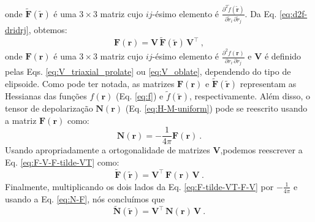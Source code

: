 onde $\tilde{\mathbf{F}}(\tilde{\mathbf{r}})$ é uma $3 \times 3$
matriz cujo $ij$-ésimo elemento é 
$\frac{\partial^{2} \tilde{f}(\tilde{\mathbf{r}})}
{\partial \tilde{r}_{i} \, \partial \tilde{r}_{j}}$.
Da Eq. \ref{eq:d2f-dridrj}, obtemos:
\begin{equation}
\mathbf{F}(\mathbf{r}) = \mathbf{V} \, 
\tilde{\mathbf{F}}(\tilde{\mathbf{r}}) \, \mathbf{V}^{\top} \: ,
\label{eq:F-V-F-tilde-VT}
\end{equation}
onde $\mathbf{F}(\mathbf{r})$ é uma $3 \times 3$
matriz cujo $ij$-ésimo elemento é 
$\frac{\partial^{2} f(\mathbf{r})}
{\partial r_{i} \, \partial r_{j}}$ e
$\mathbf{V}$ é definido pelas Eqs. 
\ref{eq:V_triaxial_prolate} ou
\ref{eq:V_oblate}, dependendo do tipo de
elipsoide. Como pode ter notada, as matrizes $\mathbf{F}(\mathbf{r})$ e
$\tilde{\mathbf{F}}(\tilde{\mathbf{r}})$ representam as Hessianas
das funções $f(\mathbf{r})$ (Eq. \ref{eq:f})
e $\tilde{f}(\tilde{\mathbf{r}})$, respectivamente.
Além disso, o tensor de depolarização $\mathbf{N}(\mathbf{r})$
(Eq. \ref{eq:H-M-uniform}) pode se 
reescrito usando a matriz $\mathbf{F}(\mathbf{r})$
como:
\begin{equation}
\mathbf{N}(\mathbf{r}) = - \frac{1}{4 \pi} \mathbf{F}(\mathbf{r}) \: .
\label{eq:N-F}
\end{equation}
Usando apropriadamente a ortogonalidade de matrizes
$\mathbf{V}$,podemos reescrever a Eq. \ref{eq:F-V-F-tilde-VT}
como:
\begin{equation}
\tilde{\mathbf{F}}(\tilde{\mathbf{r}}) = \mathbf{V}^{\top} \, 
\mathbf{F}(\mathbf{r}) \, \mathbf{V} \: .
\label{eq:F-tilde-VT-F-V}
\end{equation}
Finalmente, multiplicando os dois lados da Eq. \ref{eq:F-tilde-VT-F-V}
por $-\frac{1}{4 \pi}$ e usando a Eq. \ref{eq:N-F},
nós concluímos que 
\begin{equation}
\tilde{\mathbf{N}}(\tilde{\mathbf{r}}) = 
\mathbf{V}^{\top} \, \mathbf{N}(\mathbf{r}) \, \mathbf{V} \: .
\label{eq:N-tilde-VT-N-V}
\end{equation}